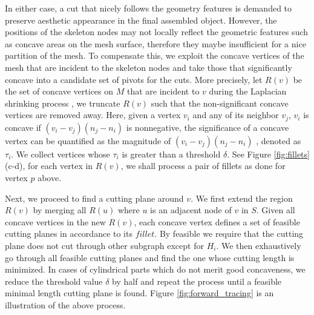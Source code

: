In either case, a cut that nicely follows the geometry features is demanded to preserve aesthetic appearance in the final assembled object. However, the positions of the skeleton nodes may not locally reflect the geometric features such as concave areas on the mesh surface, therefore they maybe insufficient for a nice partition of the mesh. To compensate this, we exploit the concave vertices of the mesh that are incident to the skeleton nodes and take those that significantly concave into a candidate set of pivots for the cuts. More precisely, let $R(v)$ be the set of concave vertices on $M$ that are incident to $v$ during the Laplacian shrinking process \cite{AuTCCL08}, we truncate $R(v)$ such that the non-significant concave vertices are removed away. Here, given a vertex $v_i$ and any of its neighbor $v_j$, $v_i$ is concave if $(v_i - v_j)(n_j - n_i)$ is nonnegative, the significance of a concave vertex can be quantified as the magnitude of $(v_i - v_j)(n_j - n_i)$ \cite{au2012mesh}, denoted as $\tau_i$. We collect vertices whose $\tau_i$ is greater than a threshold $\delta$.  See Figure \ref{fig:fillets}(c-d), for each vertex in $R(v)$, we shall process a pair of fillets as done for vertex $p$ above.


Next, we proceed to find a cutting plane around $v$. We first extend the region $R(v)$ by merging all $R(u)$ where $u$ is an adjacent node of $v$ in $S$. Given all concave vertices in the new $R(v)$, each concave vertex defines a set of feasible cutting planes in accordance to its $fillet$. By feasible we require that the cutting plane does not cut through other subgraph except for $H_i$. We then exhaustively go through all feasible cutting planes and find the one whose cutting length is minimized. In cases of cylindrical parts which do not merit good concaveness, we reduce the threshold value $\delta$ by half and repeat the process until a feasible minimal length cutting plane is found. Figure \ref{fig:forward_tracing} is an illustration of the above process.



